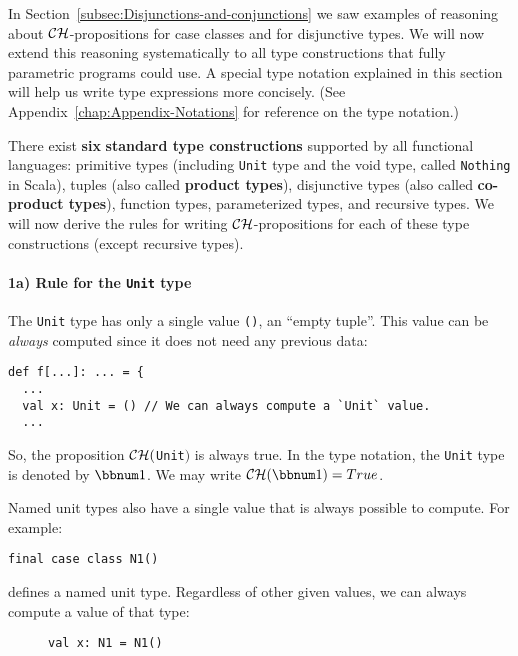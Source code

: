 In Section~\ref{subsec:Disjunctions-and-conjunctions} we saw examples
of reasoning about ${\cal CH}$-propositions for case classes and
for disjunctive types. We will now extend this reasoning systematically
to all type constructions that fully parametric programs could use.
A special type notation explained in this section
will help us write type expressions more concisely. (See Appendix~\ref{chap:Appendix-Notations}
for reference on the type notation.)

There exist \textbf{six} \textbf{standard type constructions}
supported by all functional languages: primitive types (including
\lstinline!Unit! type and the void type, called \lstinline!Nothing!
in Scala), tuples (also called \textbf{product
types}), disjunctive types (also called \textbf{co-product
types}), function types, parameterized types, and recursive types.
We will now derive the rules for writing ${\cal CH}$-propositions
for each of these type constructions (except recursive types).

\paragraph{1a) Rule for the \texttt{Unit} type}

The \lstinline!Unit! type has only a single value \lstinline!()!,
an \textsf{``}empty tuple\textsf{''}. This value can be \emph{always} computed since
it does not need any previous data:
\begin{lstlisting}
def f[...]: ... = {
  ...
  val x: Unit = () // We can always compute a `Unit` value.
  ...
\end{lstlisting}
So, the proposition ${\cal CH}($\lstinline!Unit!$)$ is always true.
In the type notation, the \lstinline!Unit! type is denoted by $\bbnum 1$.
We may write $\mathcal{CH}(\bbnum 1)=True$.

Named unit types also have a single value
that is always possible to compute. For example:
\begin{lstlisting}
final case class N1()
\end{lstlisting}
defines a named unit type. Regardless of other given values, we can
always compute a value of that type:

\begin{wrapfigure}{l}{0.42\columnwidth}%
\vspace{-0.7\baselineskip}
\begin{lstlisting}
val x: N1 = N1()
\end{lstlisting}

\vspace{-0.9\baselineskip}
\end{wrapfigure}%

